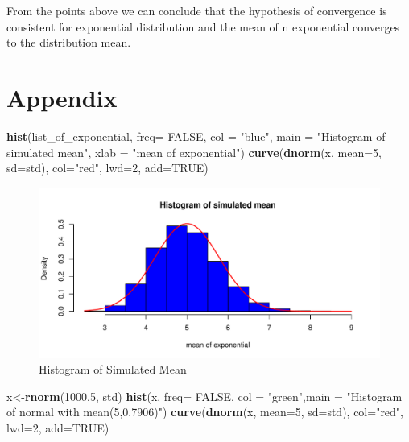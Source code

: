\documentclass[]{article}
\newenvironment{Shaded}{\begin{snugshade}}{\end{snugshade}}
\newcommand{\KeywordTok}[1]{\textcolor[rgb]{0.13,0.29,0.53}{\textbf{{#1}}}}
\newcommand{\DataTypeTok}[1]{\textcolor[rgb]{0.13,0.29,0.53}{{#1}}}
\newcommand{\DecValTok}[1]{\textcolor[rgb]{0.00,0.00,0.81}{{#1}}}
\newcommand{\StringTok}[1]{\textcolor[rgb]{0.31,0.60,0.02}{{#1}}}
\newcommand{\OtherTok}[1]{\textcolor[rgb]{0.56,0.35,0.01}{{#1}}}
\newcommand{\NormalTok}[1]{{#1}}
\begin{document}
From the points above we can conclude that the hypothesis of convergence
is consistent for exponential distribution and the mean of n exponential
converges to the distribution mean.

\newpage

\section{Appendix}\label{appendix}

\begin{Shaded}
\begin{Highlighting}[]
    \KeywordTok{hist}\NormalTok{(list_of_exponential, }\DataTypeTok{freq=} \OtherTok{FALSE}\NormalTok{, }\DataTypeTok{col =} \StringTok{"blue"}\NormalTok{, }\DataTypeTok{main =} \StringTok{"Histogram of simulated mean"}\NormalTok{, }\DataTypeTok{xlab =} \StringTok{"mean of exponential"}\NormalTok{)}
    \KeywordTok{curve}\NormalTok{(}\KeywordTok{dnorm}\NormalTok{(x, }\DataTypeTok{mean=}\DecValTok{5}\NormalTok{, }\DataTypeTok{sd=}\NormalTok{std), }
          \DataTypeTok{col=}\StringTok{"red"}\NormalTok{, }\DataTypeTok{lwd=}\DecValTok{2}\NormalTok{, }\DataTypeTok{add=}\OtherTok{TRUE}\NormalTok{)}
\end{Highlighting}
\end{Shaded}

\begin{figure}[htbp]
\centering
\includegraphics{TCL_Convergence_files/figure-latex/unnamed-chunk-6-1.pdf}
\caption{Histogram of Simulated Mean}
\end{figure}

\begin{Shaded}
\begin{Highlighting}[]
\NormalTok{x<-}\KeywordTok{rnorm}\NormalTok{(}\DecValTok{1000}\NormalTok{,}\DecValTok{5}\NormalTok{, std) }
\KeywordTok{hist}\NormalTok{(x, }\DataTypeTok{freq=} \OtherTok{FALSE}\NormalTok{, }\DataTypeTok{col =} \StringTok{"green"}\NormalTok{,}\DataTypeTok{main =} \StringTok{"Histogram of normal with mean(5,0.7906)"}\NormalTok{)}
\KeywordTok{curve}\NormalTok{(}\KeywordTok{dnorm}\NormalTok{(x, }\DataTypeTok{mean=}\DecValTok{5}\NormalTok{, }\DataTypeTok{sd=}\NormalTok{std), }
          \DataTypeTok{col=}\StringTok{"red"}\NormalTok{, }\DataTypeTok{lwd=}\DecValTok{2}\NormalTok{, }\DataTypeTok{add=}\OtherTok{TRUE}\NormalTok{)}
\end{Highlighting}
\end{Shaded}
\end{document}
